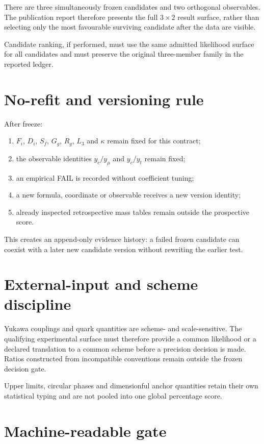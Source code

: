 There are three simultaneously frozen candidates and two orthogonal observables.
The publication report therefore presents the full \(3\times2\) result surface,
rather than selecting only the most favourable surviving candidate after the
data are visible.

Candidate ranking, if performed, must use the same admitted likelihood surface
for all candidates and must preserve the original three-member family in the
reported ledger.

\section{No-refit and versioning rule}

After freeze:
\begin{enumerate}
\item \(F_i\), \(D_i\), \(S_f\), \(G_g\), \(R_g\), \(L_3\) and \(\kappa\) remain fixed for this contract;
\item the observable identities \(y_c/y_\mu\) and \(y_c/y_t\) remain fixed;
\item an empirical FAIL is recorded without coefficient tuning;
\item a new formula, coordinate or observable receives a new version identity;
\item already inspected retrospective mass tables remain outside the prospective score.
\end{enumerate}

This creates an append-only evidence history: a failed frozen candidate can
coexist with a later new candidate version without rewriting the earlier test.

\section{External-input and scheme discipline}

Yukawa couplings and quark quantities are scheme- and scale-sensitive.
The qualifying experimental surface must therefore provide a common likelihood
or a declared translation to a common scheme before a precision decision is
made.  Ratios constructed from incompatible conventions remain outside the
frozen decision gate.

Upper limits, circular phases and dimensionful anchor quantities retain their
own statistical typing and are not pooled into one global percentage score.

\section{Machine-readable gate}

